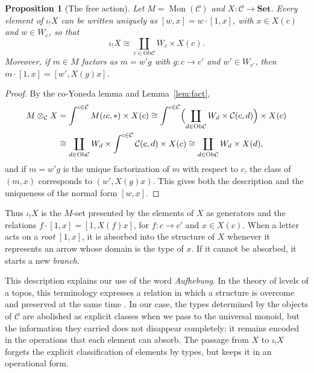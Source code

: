 \documentclass[11pt]{amsart}
\newtheorem{proposition}[teo]{Proposition}
\theoremstyle{definition}
\theoremstyle{remark}
\numberwithin{figure}{section}%
\newcommand{\CC}{\mathcal{C}}
\DeclareMathOperator{\Mon}{Mon}
\newcommand{\Ob}{\mathrm{Ob}}
\newcommand{\Set}{\mathbf{Set}}
\begin{document}
\begin{proposition}[The free action]
\label{prop:free}
Let $M=\Mon(\CC)$ and $X\colon\CC\to\Set$. Every element of $\iota_!X$ can be written uniquely as $[w,x]=w\cdot[1,x]$, with $x\in X(c)$ and $w\in W_c$, so that
\[
\iota_!X\cong\coprod_{c\in\Ob\CC}W_c\times X(c).
\]
Moreover, if $m\in M$ factors as $m=w'g$ with $g\colon c\to c'$ and $w'\in W_{c'}$, then $m\cdot[1,x]=[w',X(g)x]$.
\end{proposition}

\begin{proof}
By the co-Yoneda lemma and Lemma~\ref{lem:fact},
\[
\begin{aligned}
M\otimes_{\CC}X&=\int^{c\in\CC}M(\iota c,*)\times X(c)\cong\int^{c\in\CC}\Bigl(\coprod_{d\in\Ob\CC}W_d\times\CC(c,d)\Bigr)\times X(c)\\
&\cong\coprod_{d\in\Ob\CC}W_d\times\int^{c\in\CC}\CC(c,d)\times X(c)\cong\coprod_{d\in\Ob\CC}W_d\times X(d),
\end{aligned}
\]
and if $m=w'g$ is the unique factorization of $m$ with respect to $c$, the class of $(m,x)$ corresponds to $(w',X(g)x)$. This gives both the description and the uniqueness of the normal form $[w,x]$.
\end{proof}

Thus $\iota_!X$ is the $M$-set presented by the elements of $X$ as generators and the relations $f\cdot[1,x]=[1,X(f)x]$, for $f\colon c\to c'$ and $x\in X(c)$. When a letter acts on a \emph{root} $[1,x]$, it is absorbed into the structure of $X$ whenever it represents an arrow whose domain is the type of $x$. If it cannot be absorbed, it starts a new \emph{branch}.

This description explains our use of the word \emph{Aufhebung}. In the theory of levels of a topos, this terminology expresses a relation in which a structure is overcome and preserved at the same time \cite[Section~1]{KennettRiehlRoyZaks2011}. In our case, the types determined by the objects of $\CC$ are abolished as explicit classes when we pass to the universal monoid, but the information they carried does not disappear completely: it remains encoded in the operations that each element can absorb. The passage from $X$ to $\iota_!X$ forgets the explicit classification of elements by types, but keeps it in an operational form.
\end{document}
